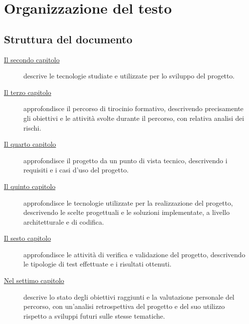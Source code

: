 \section{Organizzazione del testo}\label{sec:organizzazione-del-testo}

\subsection{Struttura del documento}\label{subsec:struttura-del-documento}

\begin{description}
    \item[{\hyperref[cap:tecnologie]{Il secondo capitolo}}] descrive le tecnologie studiate e utilizzate per lo sviluppo del progetto.
    
    \item[{\hyperref[cap:descrizione-stage]{Il terzo capitolo}}] approfondisce il percorso di tirocinio formativo, descrivendo precisamente gli obiettivi e le attività svolte durante il percorso,
    con relativa analisi dei rischi.
    
    \item[{\hyperref[cap:analisi-requisiti]{Il quarto capitolo}}] approfondisce il progetto da un punto di vista tecnico, descrivendo i requisiti e i casi d'uso del progetto.
    
    \item[{\hyperref[cap:progettazione-codifica]{Il quinto capitolo}}] approfondisce le tecnologie utilizzate per la realizzazione del progetto, descrivendo le scelte progettuali e le soluzioni implementate,
    a livello architetturale e di codifica.
    
    \item[{\hyperref[cap:verifica-validazione]{Il sesto capitolo}}] approfondisce le attività di verifica e validazione del progetto, descrivendo le tipologie di test effettuate e i risultati ottenuti.
    
    \item[{\hyperref[cap:conclusioni]{Nel settimo capitolo}}] descrive lo stato degli obiettivi raggiunti e la valutazione personale del percorso, con un'analisi retrospettiva del progetto e del suo utilizzo
    rispetto a sviluppi futuri sulle stesse tematiche.
\end{description}

\clearpage

